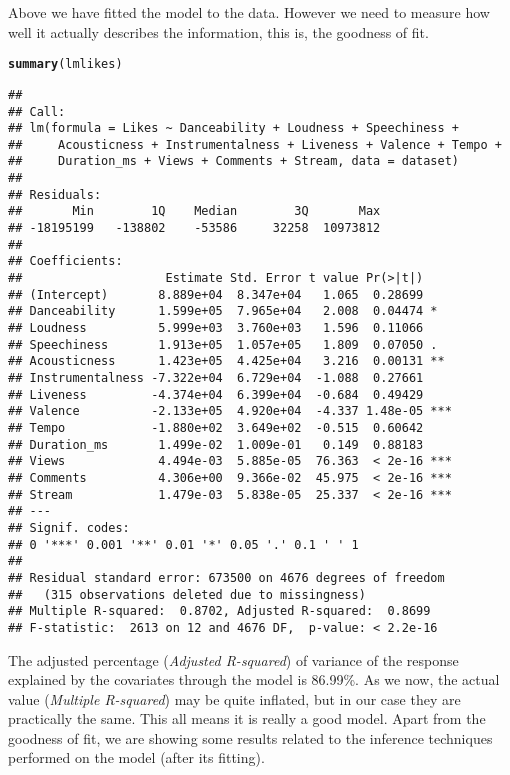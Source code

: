 \documentclass[11pt]{article}\usepackage[]{graphicx}\usepackage[]{xcolor}
\makeatletter
\newcommand{\hldef}[1]{\textcolor[rgb]{0.345,0.345,0.345}{#1}}%
\newcommand{\hlkwd}[1]{\textcolor[rgb]{0.737,0.353,0.396}{\textbf{#1}}}%
\newenvironment{kframe}{%
 \def\at@end@of@kframe{}%
 \ifinner\ifhmode%
  \def\at@end@of@kframe{\end{minipage}}%
  \begin{minipage}{\columnwidth}%
 \fi\fi%
 \def\FrameCommand##1{\hskip\@totalleftmargin \hskip-\fboxsep
 \colorbox{shadecolor}{##1}\hskip-\fboxsep
     \hskip-\linewidth \hskip-\@totalleftmargin \hskip\columnwidth}%
 \MakeFramed {\advance\hsize-\width
   \@totalleftmargin\z@ \linewidth\hsize
   \@setminipage}}%
 {\par\unskip\endMakeFramed%
 \at@end@of@kframe}
\newenvironment{knitrout}{}{} %
\makeatother
\begin{document}
Above we have fitted the model to the data. However we need to measure how well it actually describes the information, this is, the goodness of fit.
\begin{knitrout}
\color{fgcolor}\begin{kframe}
\begin{alltt}
\hlkwd{summary}\hldef{(lmlikes)}
\end{alltt}
\begin{verbatim}
## 
## Call:
## lm(formula = Likes ~ Danceability + Loudness + Speechiness + 
##     Acousticness + Instrumentalness + Liveness + Valence + Tempo + 
##     Duration_ms + Views + Comments + Stream, data = dataset)
## 
## Residuals:
##       Min        1Q    Median        3Q       Max 
## -18195199   -138802    -53586     32258  10973812 
## 
## Coefficients:
##                    Estimate Std. Error t value Pr(>|t|)    
## (Intercept)       8.889e+04  8.347e+04   1.065  0.28699    
## Danceability      1.599e+05  7.965e+04   2.008  0.04474 *  
## Loudness          5.999e+03  3.760e+03   1.596  0.11066    
## Speechiness       1.913e+05  1.057e+05   1.809  0.07050 .  
## Acousticness      1.423e+05  4.425e+04   3.216  0.00131 ** 
## Instrumentalness -7.322e+04  6.729e+04  -1.088  0.27661    
## Liveness         -4.374e+04  6.399e+04  -0.684  0.49429    
## Valence          -2.133e+05  4.920e+04  -4.337 1.48e-05 ***
## Tempo            -1.880e+02  3.649e+02  -0.515  0.60642    
## Duration_ms       1.499e-02  1.009e-01   0.149  0.88183    
## Views             4.494e-03  5.885e-05  76.363  < 2e-16 ***
## Comments          4.306e+00  9.366e-02  45.975  < 2e-16 ***
## Stream            1.479e-03  5.838e-05  25.337  < 2e-16 ***
## ---
## Signif. codes:  
## 0 '***' 0.001 '**' 0.01 '*' 0.05 '.' 0.1 ' ' 1
## 
## Residual standard error: 673500 on 4676 degrees of freedom
##   (315 observations deleted due to missingness)
## Multiple R-squared:  0.8702,	Adjusted R-squared:  0.8699 
## F-statistic:  2613 on 12 and 4676 DF,  p-value: < 2.2e-16
\end{verbatim}
\end{kframe}
\end{knitrout}
The adjusted percentage (\textit{Adjusted R-squared}) of variance of the response explained by the covariates through the model is 86.99\%. As we now, the actual value (\textit{Multiple R-squared}) may be quite inflated, but in our case they are practically the same. This  all means it is really a good model. 
Apart from the goodness of fit, we are showing some results related to the inference techniques performed on the model (after its fitting).
\end{document}
